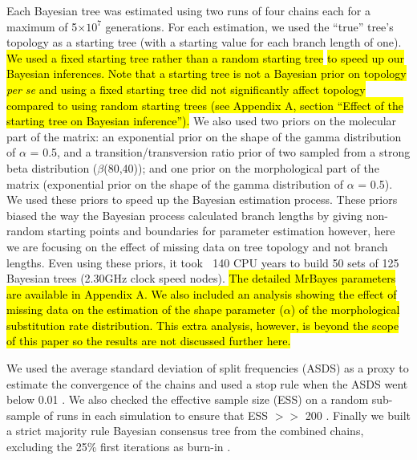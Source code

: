 \documentclass[12pt,letterpaper]{article}
\begin{document}
Each Bayesian tree was estimated using two runs of four chains each for a maximum of 5$\times$$10^7$ generations.
For each estimation, we used the ``true'' tree's topology as a starting tree (with a starting value for each branch length of one).
\hl{We used a fixed starting tree rather than a random starting tree }\citep[\hl{default MrBayes;}][]{Ronquist2012mrbayes} \hl{to speed up our Bayesian inferences.
Note that a starting tree is not a Bayesian prior on topology \textit{per se} and using a fixed starting tree did not significantly affect topology compared to using random starting trees (see Appendix A, section ``Effect of the starting tree on Bayesian inference'').}
We also used two priors on the molecular part of the matrix: an exponential prior on the shape of the gamma distribution of $\alpha$ = 0.5, and a transition/transversion ratio prior of two sampled from a strong beta distribution ($\beta$(80,40)); and one prior on the morphological part of the matrix (exponential prior on the shape of the gamma distribution of $\alpha$ = 0.5).
We used these priors to speed up the Bayesian estimation process.
These priors biased the way the Bayesian process calculated branch lengths by giving non-random starting points and boundaries for parameter estimation however, here we are focusing on the effect of missing data on tree topology and not branch lengths.
Even using these priors, it took $~$ 140 CPU years to build 50 sets of 125 Bayesian trees (2.30GHz clock speed nodes).
\hl{The detailed MrBayes parameters are available in Appendix A.
We also included an analysis showing the effect of missing data on the estimation of the shape parameter ($\alpha$) of the morphological substitution rate distribution.
This extra analysis, however, is beyond the scope of this paper so the results are not discussed further here.}

We used the average standard deviation of split frequencies (ASDS) as a proxy to estimate the convergence of the chains and used a stop rule when the ASDS went below 0.01 \citep{Ronquist2012mrbayes}.
We also checked the effective sample size (ESS) on a random sub-sample of runs in each simulation to ensure that ESS $>>$ 200 \citep{drummond2006ess}.
Finally we built a strict majority rule Bayesian consensus tree from the combined chains, excluding the 25\% first iterations as burn-in \citep{Ronquist2012mrbayes}.

\end{document}

